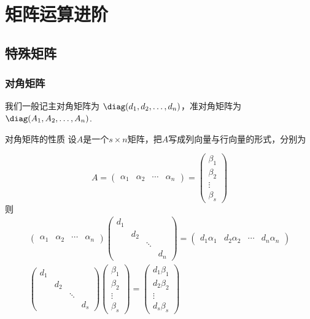 \chapter{矩阵运算进阶} \label{chap:矩阵运算进阶}

\section{特殊矩阵}

\subsection{对角矩阵}

我们一般记主对角矩阵为 $\diag(d_1,d_2,\ldots,d_n)$，准对角矩阵为 $\diag(A_1,A_2,\ldots,A_n)$.
\begin{theorem}{}{对角矩阵的性质}
    设$A$是一个$s \times n$矩阵，把$A$写成列向量与行向量的形式，分别为

    \[ A = \begin{pmatrix}\alpha_1 & \alpha_2 & \cdots & \alpha_n\end{pmatrix} = \begin{pmatrix} \beta_1 \\ \beta_2 \\ \vdots \\ \beta_s \end{pmatrix} \]
    则
    \begin{gather*}
        \begin{pmatrix}\alpha_1 & \alpha_2 & \cdots & \alpha_n\end{pmatrix}
        \begin{pmatrix}
            d_1 &     &        &     \\
                & d_2 &        &     \\
                &     & \ddots &     \\
                &     &        & d_n
        \end{pmatrix} = \begin{pmatrix}d_1\alpha_1 & d_2\alpha_2 & \cdots & d_n\alpha_n\end{pmatrix} \\
        \begin{pmatrix}
            d_1 &     &        &     \\
                & d_2 &        &     \\
                &     & \ddots &     \\
                &     &        & d_s
        \end{pmatrix} \begin{pmatrix} \beta_1 \\ \beta_2 \\ \vdots \\ \beta_s \end{pmatrix} = \begin{pmatrix} d_1\beta_1 \\ d_2\beta_2 \\ \vdots \\ d_s\beta_s \end{pmatrix}
    \end{gather*}


\end{theorem}
